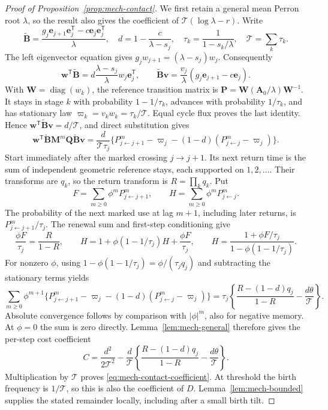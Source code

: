 \begin{proof}[Proof of Proposition~\ref{prop:mech-contact}]
We first retain a general mean Perron root \(\lambda\), so the result also gives the coefficient of \(\mathcal T(\log\lambda-r)\). Write
\[
 \widetilde{\mathbf B}=\frac{g_j\mathbf e_{j+1}\mathbf e_j^{\mathsf T}-c\mathbf e_j\mathbf e_j^{\mathsf T}}{\lambda},
 \quad d=1-\frac{c}{\lambda-s_j},\quad
 \tau_k=\frac1{1-s_k/\lambda},\quad \mathcal T=\sum_k\tau_k.
\]
The left eigenvector equation gives \(g_jw_{j+1}=(\lambda-s_j)w_j\). Consequently
\[
 \mathbf w^{\mathsf T}\widetilde{\mathbf B}=d\frac{\lambda-s_j}{\lambda}w_j\mathbf e_j^{\mathsf T},
 \qquad \widetilde{\mathbf B}\mathbf v=\frac{v_j}{\lambda}(g_j\mathbf e_{j+1}-c\mathbf e_j).
\]
With \(\mathbf W=\operatorname{diag}(w_k)\), the reference transition matrix is \(\mathbf P=\mathbf W(\mathbf A_0/\lambda)\mathbf W^{-1}\). It stays in stage \(k\) with probability \(1-1/\tau_k\), advances with probability \(1/\tau_k\), and has stationary law \(\varpi_k=v_kw_k=\tau_k/\mathcal T\). Equal cycle flux proves the last identity. Hence \(\mathbf w^{\mathsf T}\widetilde{\mathbf B}\mathbf v=d/\mathcal T\), and direct substitution gives
\begin{equation}\label{eq:mech-contact-contraction}
 \mathbf w^{\mathsf T}\widetilde{\mathbf B}\mathbf M^m\mathbf Q\widetilde{\mathbf B}\mathbf v
 =\frac{d}{\mathcal T\tau_j}\{P^m_{j\leftarrow j+1}-\varpi_j
 -(1-d)(P^m_{j\leftarrow j}-\varpi_j)\}.
\end{equation}
Start immediately after the marked crossing \(j\to j+1\). Its next return time is the sum of independent geometric reference stays, each supported on \(1,2,\ldots\). Their transforms are \(q_k\), so the return transform is \(R=\prod_kq_k\). Put
\[
 F=\sum_{m\geq0}\phi^mP^m_{j\leftarrow j+1},\qquad
 H=\sum_{m\geq0}\phi^mP^m_{j\leftarrow j}.
\]
The probability of the next marked use at lag \(m+1\), including later returns, is \(P^m_{j\leftarrow j+1}/\tau_j\). The renewal sum and first-step conditioning give
\[
 \frac{\phi F}{\tau_j}=\frac R{1-R},\qquad
 H=1+\phi(1-1/\tau_j)H+\frac{\phi F}{\tau_j},\qquad
 H=\frac{1+\phi F/\tau_j}{1-\phi(1-1/\tau_j)}.
\]
For nonzero \(\phi\), using \(1-\phi(1-1/\tau_j)=\phi/(\tau_jq_j)\) and subtracting the stationary terms yields
\[
 \sum_{m\geq0}\phi^{m+1}
 \{P^m_{j\leftarrow j+1}-\varpi_j-(1-d)(P^m_{j\leftarrow j}-\varpi_j)\}
 =\tau_j\left\{\frac{R-(1-d)q_j}{1-R}-\frac{d\theta}{\mathcal T}\right\}.
\]
Absolute convergence follows by comparison with \(|\phi|^m\), also for negative memory. At \(\phi=0\) the sum is zero directly. Lemma~\ref{lem:mech-general} therefore gives the per-step cost coefficient
\[
 C=\frac{d^2}{2\mathcal T^2}-\frac d{\mathcal T}
 \left\{\frac{R-(1-d)q_j}{1-R}-\frac{d\theta}{\mathcal T}\right\}.
\]
Multiplication by \(\mathcal T\) proves \eqref{eq:mech-contact-coefficient}. At threshold the birth frequency is \(1/\mathcal T\), so this is also the coefficient of \(D\). Lemma~\ref{lem:mech-bounded} supplies the stated remainder locally, including after a small birth tilt.


\end{proof}
